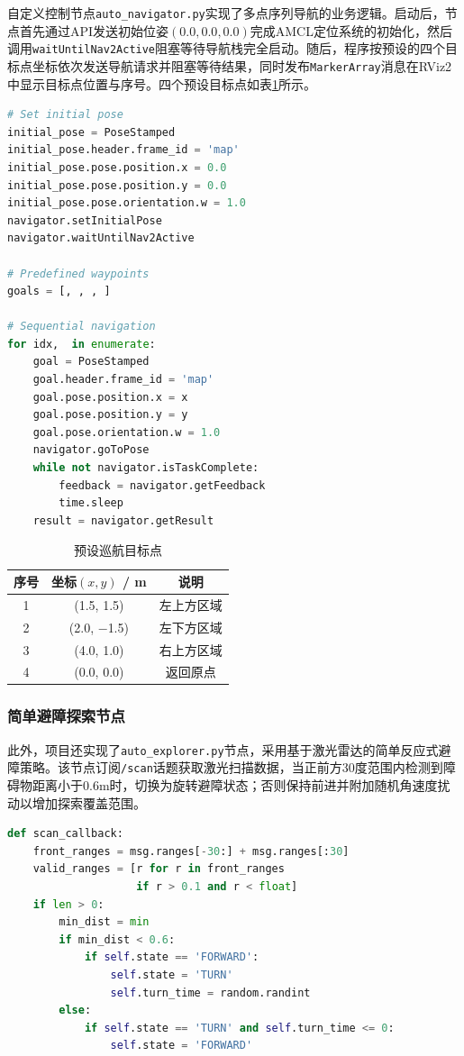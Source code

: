 \documentclass[a4paper,12pt]{article}
\begin{document}
自定义控制节点\texttt{auto\_navigator.py}实现了多点序列导航的业务逻辑。启动后，节点首先通过API发送初始位姿$(0.0, 0.0, 0.0)$完成AMCL定位系统的初始化，然后调用\texttt{waitUntilNav2Active}阻塞等待导航栈完全启动。随后，程序按预设的四个目标点坐标依次发送导航请求并阻塞等待结果，同时发布\texttt{MarkerArray}消息在RViz2中显示目标点位置与序号。四个预设目标点如表\ref{tab:waypoints}所示。

\begin{lstlisting}[language=Python,title={多点导航核心代码}]
# Set initial pose
initial_pose = PoseStamped
initial_pose.header.frame_id = 'map'
initial_pose.pose.position.x = 0.0
initial_pose.pose.position.y = 0.0
initial_pose.pose.orientation.w = 1.0
navigator.setInitialPose
navigator.waitUntilNav2Active

# Predefined waypoints
goals = [, , , ]

# Sequential navigation
for idx,  in enumerate:
    goal = PoseStamped
    goal.header.frame_id = 'map'
    goal.pose.position.x = x
    goal.pose.position.y = y
    goal.pose.orientation.w = 1.0
    navigator.goToPose
    while not navigator.isTaskComplete:
        feedback = navigator.getFeedback
        time.sleep
    result = navigator.getResult
\end{lstlisting}

\begin{table}[H]
\centering
\caption{预设巡航目标点}
\label{tab:waypoints}
\begin{tabular}{ccc}
\toprule
序号 & 坐标$(x, y)$ / m & 说明 \\
\midrule
1 & (1.5, 1.5) & 左上方区域 \\
2 & (2.0, $-$1.5) & 左下方区域 \\
3 & (4.0, 1.0) & 右上方区域 \\
4 & (0.0, 0.0) & 返回原点 \\
\bottomrule
\end{tabular}
\end{table}

\subsubsection{简单避障探索节点}

此外，项目还实现了\texttt{auto\_explorer.py}节点，采用基于激光雷达的简单反应式避障策略。该节点订阅\texttt{/scan}话题获取激光扫描数据，当正前方30度范围内检测到障碍物距离小于0.6m时，切换为旋转避障状态；否则保持前进并附加随机角速度扰动以增加探索覆盖范围。

\begin{lstlisting}[language=Python,title={简单避障探索代码}]
def scan_callback:
    front_ranges = msg.ranges[-30:] + msg.ranges[:30]
    valid_ranges = [r for r in front_ranges
                    if r > 0.1 and r < float]
    if len > 0:
        min_dist = min
        if min_dist < 0.6:
            if self.state == 'FORWARD':
                self.state = 'TURN'
                self.turn_time = random.randint
        else:
            if self.state == 'TURN' and self.turn_time <= 0:
                self.state = 'FORWARD'
\end{lstlisting}
\end{document}
